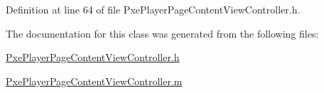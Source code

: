 Definition at line 64 of file Pxe\-Player\-Page\-Content\-View\-Controller.\-h.



The documentation for this class was generated from the following files\-:\begin{DoxyCompactItemize}
\item 
\hyperlink{_pxe_player_page_content_view_controller_8h}{Pxe\-Player\-Page\-Content\-View\-Controller.\-h}\item 
\hyperlink{_pxe_player_page_content_view_controller_8m}{Pxe\-Player\-Page\-Content\-View\-Controller.\-m}\end{DoxyCompactItemize}
